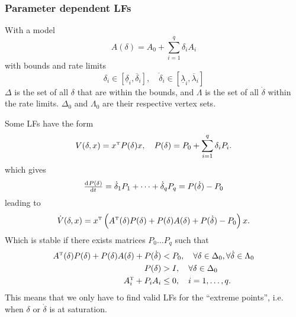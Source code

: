 \subsubsection{Parameter dependent LFs}
With a model
%
\begin{equation}
  A(\delta) = A_0 + \sum_{i=1}^q \delta_i A_i
\end{equation}
%
with bounds and rate limits
%
\begin{equation}
  \delta_i \in [\underline\delta_i, \overline\delta_i], \quad \dot\delta_i \in [\underline\lambda_i, \overline\lambda_i ]
\end{equation}
%
$\Delta$ is the set of all $\delta$ that are within the bounds, and $\Lambda$ is the set of all $\dot\delta$ within the rate limits. $\Delta_0$ and $\Lambda_0$ are their respective vertex sets.

Some LFs have the form
%
\begin{equation}
  V(\delta,x) = x\tp P(\delta)x,\quad P(\delta) = P_0 + \sum_{i=1}^q \delta_i P_i.
\end{equation}
%
which gives
%
\begin{equation}
  \od{P(\delta)}{t} = \dot\delta_1 P_1 + \dots + \dot\delta_q P_q = P(\dot\delta) - P_0
\end{equation}
%
leading to
%
\begin{equation}
  \dot{V}(\delta,x) = x\tp \left(A\tp(\delta) P(\delta) + P(\delta) A(\delta) + P(\dot{\delta}) - P_0 \right)x.
\end{equation}
%
Which is stable if there exists matrices $P_0 \dots P_q$ such that
%
\begin{equation}
  \begin{split}
    A\tp(\delta)P(\delta) + P(\delta)A(\delta) + P(\dot\delta) &< P_0, \quad \forall \delta \in \Delta_0, \forall \dot\delta \in \Lambda_0 \\
    P(\delta) &> I, \quad \forall \delta \in \Delta_0 \\
    A_i\tp + P_iA_i &\leq 0,\quad i = 1,\dots,q.
  \end{split}
\end{equation}
%
This means that we only have to find valid LFs for the ``extreme points'', i.e. when $\delta$ or $\dot\delta$ is at saturation.
